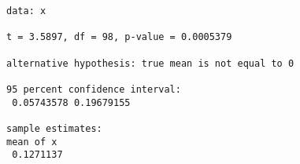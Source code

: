 \documentclass{article}
\begin{document}
\begin{verbatim}
data: x

t = 3.5897, df = 98, p-value = 0.0005379

alternative hypothesis: true mean is not equal to 0

95 percent confidence interval:
 0.05743578 0.19679155

sample estimates:
mean of x
 0.1271137
\end{verbatim}
\end{document}
